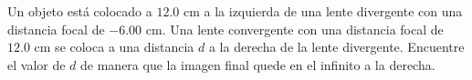 \item Un objeto está colocado a $12.0\text{ cm}$ a la izquierda de una lente divergente con una distancia focal de $-6.00\text{ cm}$. Una lente convergente con una distancia focal de $12.0\text{ cm}$ se coloca a una distancia $d$ a la derecha de la lente divergente. Encuentre el valor de $d$ de manera que la imagen final quede en el infinito a la derecha.